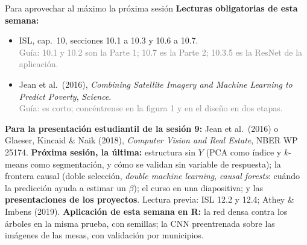 \documentclass{beamer}
\newcommand{\1}{\mathbb{I}}
\begin{document}
\begin{frame}{Para aprovechar al máximo la próxima sesión}
\small
\textbf{Lecturas obligatorias de esta semana:}
\begin{itemize}\itemsep2pt
  \item ISL, cap.\ 10, secciones 10.1 a 10.3 y 10.6 a 10.7. \\ \textcolor{gray}{Guía: 10.1 y 10.2 son la Parte 1; 10.7 es la Parte 2; 10.3.5 es la ResNet de la aplicación.}
  \item Jean et al.\ (2016), \emph{Combining Satellite Imagery and Machine Learning to Predict Poverty}, \emph{Science}. \\ \textcolor{gray}{Guía: es corto; concéntrense en la figura 1 y en el diseño en dos etapas.}
\end{itemize}
\textbf{Para la presentación estudiantil de la sesión 9:} Jean et al.\ (2016) o Glaeser, Kincaid \& Naik (2018), \emph{Computer Vision and Real Estate}, NBER WP 25174.
\pause
\textbf{Próxima sesión, la última:} estructura sin $Y$ (PCA como índice y $k$-means como segmentación, y cómo se validan sin variable de respuesta); la frontera causal (doble selección, \emph{double machine learning}, \emph{causal forests}: cuándo la predicción ayuda a estimar un $\beta$); el curso en una diapositiva; y las \textbf{presentaciones de los proyectos}. Lectura previa: ISL 12.2 y 12.4; Athey \& Imbens (2019).
\pause
\textbf{Aplicación de esta semana en R:} la red densa contra los árboles en la misma prueba, con semillas; la CNN preentrenada sobre las imágenes de las mesas, con validación por municipios.
\end{frame}
\end{document}
